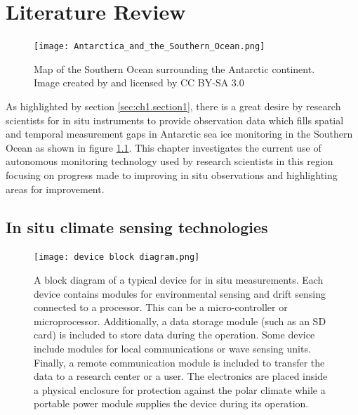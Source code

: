 
\chapter{Literature Review}
\label{ch:chapter2}

\begin{figure}[H]
\centering
\texttt{[image: Antarctica\_and\_the\_Southern\_Ocean.png]}
\caption{Map of the Southern Ocean surrounding the Antarctic continent. Image created by \textcite{Hogweed2015Ocean} and licensed by CC BY-SA 3.0}
\label{fig:Antarctica_Southern_Ocean}
\end{figure}

As highlighted by section \ref{sec:ch1.section1}, there is a great desire by research scientists for in situ instruments to provide observation data which fills spatial and temporal measurement gaps in Antarctic sea ice monitoring in the Southern Ocean as shown in figure \ref{fig:Antarctica_Southern_Ocean}. This chapter investigates the current use of autonomous monitoring technology used by research scientists in this region focusing on progress made to improving in situ observations and highlighting areas for improvement.

\newpage
\section{In situ climate sensing technologies}


\begin{figure}[H]
	\centering
	\texttt{[image: device block diagram.png]}
	\caption{A block diagram of a typical device for in situ measurements. Each device contains modules for environmental sensing and drift sensing connected to a processor. This can be a micro-controller or microprocessor. Additionally, a data storage module (such as an SD card) is included to store data during the operation. Some device include modules for local communications or wave sensing units. Finally, a remote communication module is included to transfer the data to a research center or a user. The electronics are placed inside a physical enclosure for protection against the polar climate while a portable power module supplies the device during its operation.}
	\label{fig:devblockdiag}
\end{figure}

